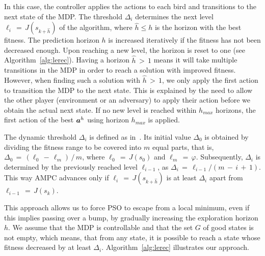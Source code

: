 In this case, the controller applies the actions to each bird and transitions to the next state of the MDP.
The threshold $\Delta_i$ determines the next level $\ell_i\,{=}\,J(s_{k+\widehat{h}})$ of the algorithm, where $\widehat{h} \leqslant h$ is the horizon with the best fitness. The prediction horizon $h$ is increased iteratively if the fitness has not been decreased enough. Upon reaching a new level, the horizon is reset to one (see Algorithm~\ref{alg:lerec}). Having a horizon $\widehat{h}\,{>}\,1$ means it will take multiple transitions in the MDP in order to reach a solution with improved fitness. However, when finding such a solution with $\widehat{h}\,{>}\,1$, we only apply the first action to transition the MDP to the next state. This is explained by the need to allow the other player (environment or an adversary) to apply their action before we obtain the actual next state. 
%
If no new level is reached within $h_{\mathit{max}}$ horizons, the first action of the best ${\boldsymbol {a}}^h$ using horizon $h_{\mathit{max}}$ is applied. 

The dynamic threshold $\Delta_i$ is defined as in~\cite{lukina2016arxiv}. Its initial value $\Delta_0$ is obtained by dividing the fitness range to be covered into $m$ equal parts, that is, $\Delta_0\,{=}\,(\ell_0\,{-}\,\ell_m)\,{/}\,m$, where $\ell_0\,{=}\,J(s_0)$ and $\ell_m\,{=}\,\varphi$. Subsequently, $\Delta_i$ is determined by the previously reached level $\ell_{i-1}$, as $\Delta_i\,{=}\,\ell_{i-1}{/}(m\,{-}\,i\,{+}\,1)$. This way AMPC advances only if $\ell_i\,{=}\,J(s_{k+\widehat{h}})$ is at least $\Delta_i$ apart from $\ell_{i-1}\,{=}\,J(s_{k})$.

This approach allows us to force PSO to 
escape from a local minimum, even if this implies passing over a bump, by gradually increasing the exploration horizon $h$. We assume that the MDP is controllable and that the set $G$ of good states is not empty, which means, that from any state, it is possible to reach a state whose fitness decreased by at least $\Delta_i$. 
Algorithm~\ref{alg:lerec} illustrates our approach.

%	

